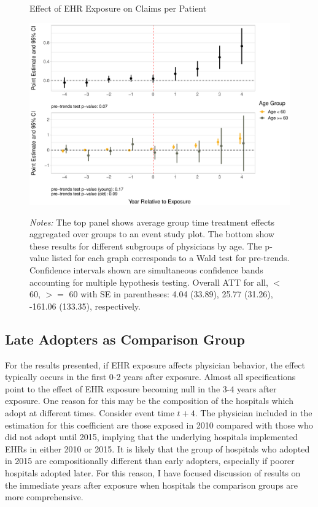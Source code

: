 \documentclass[12pt]{article}
\begin{document}
\begin{figure}[ht]
    \centering
    \captionsetup{width=.85\linewidth}
    \caption{Effect of EHR Exposure on Claims per Patient}
    \includegraphics[scale=.6]{Objects/claim_per_patient_plot.pdf}
    \label{fig:claim}
    \vspace{2mm}
    \caption*{\footnotesize{\textit{Notes:} The top panel shows average group time treatment effects aggregated over groups to an event study plot. The bottom show these results for different subgroups of physicians by age. The p-value listed for each graph corresponds to a Wald test for pre-trends. Confidence intervals shown are simultaneous confidence bands accounting for multiple hypothesis testing. Overall ATT for all, $<$ 60, $>=$ 60 with SE in parentheses: 4.04 (33.89), 25.77 (31.26), -161.06 (133.35), respectively.}}
\end{figure}


\subsection{Late Adopters as Comparison Group}

For the results presented, if EHR exposure affects physician behavior, the effect typically occurs in the first 0-2 years after exposure. Almost all specifications point to the effect of EHR exposure becoming null in the 3-4 years after exposure. One reason for this may be the composition of the hospitals which adopt at different times. Consider event time $t+4$. The physician included in the estimation for this coefficient are those exposed in 2010 compared with those who did not adopt until 2015, implying that the underlying hospitals implemented EHRs in either 2010 or 2015. It is likely that the group of hospitals who adopted in 2015 are compositionally different than early adopters, especially if poorer hospitals adopted later. For this reason, I have focused discussion of results on the immediate years after exposure when hospitals the comparison groups are more comprehensive. 
\end{document}
